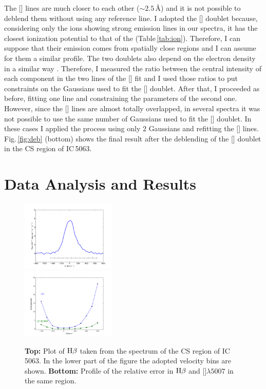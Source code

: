 \documentclass[../main.tex]{subfiles}
\begin{document}
The [] lines are much closer to each other ($\sim 2.5$\,\AA) and it is not possible to deblend them without using any reference line.
I adopted the [] doublet because, considering only the ions showing strong emission lines in our spectra, it has the closest ionization potential to that of the  (Table\,\ref{tab:ion}).
Therefore, I can suppose that their emission comes from spatially close regions and I can assume for them a similar profile.
The two doublets also depend on the electron density in a similar way \citep[see][]{OsterbrockAGN}.
Therefore, I measured the ratio between the central intensity of each component in the two lines of the [] fit and I used those ratios to put constraints on the Gaussians used to fit the [] doublet.
After that, I proceeded as before, fitting one line and constraining the parameters of the second one.
However, since the [] lines are almost totally overlapped, in several spectra it was not possible to use the same number of Gaussians used to fit the [] doublet.
In these cases I applied the process using only $2$ Gaussians and refitting the [] lines.
Fig.\,\ref{fig:deb} (bottom) shows the final result after the deblending of the [] doublet in the CS region of IC\,5063.


\section{Data Analysis and Results}
\label{sec:data_an}

\begin{figure}
\centering
\includegraphics[width=0.40\textwidth]{PhD_thesis/images/paper1/IC5063_bins.pdf} \\
\includegraphics[width=0.40\textwidth]{PhD_thesis/images/paper1/errors.pdf}
\caption[]{\textbf{Top:} Plot of $\rm H\beta$ taken from the spectrum of the CS region of IC\,5063. In the lower part of the figure the adopted velocity bins are shown. \textbf{Bottom:} Profile of the relative error in $\rm H\beta$ and []$\lambda5007$ in the same region.}
\label{fig:bins}
\end{figure}
\end{document}
